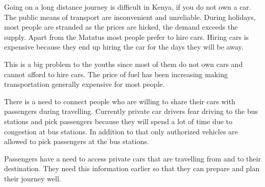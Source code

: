 Going on a long distance journey is difficult in Kenya, if you do not own a car. The public means of transport are inconvenient and unreliable. During holidays, most people are stranded as the prices are hicked, the demand exceeds the supply. Apart from the Matatus most people prefer to hire cars. Hiring cars is expensive because they end up hiring the car for the days they will be away.

This is a big problem to the youths since most of them do not own cars and cannot afford to hire cars. The price of fuel has been increasing making transportation generally expensive for most people.

There is a need to connect people who are willing to share their cars with passengers during travelling. Currently private car drivers fear driving to the bus stations and pick passengers because they will spend a lot of time due to congestion at bus stations. In addition to that only authorized vehicles are allowed to pick passengers at the bus stations.

Passengers have a need to access private cars that are travelling from and to their destination. They need this information earlier so that they can prepare and plan their journey well.